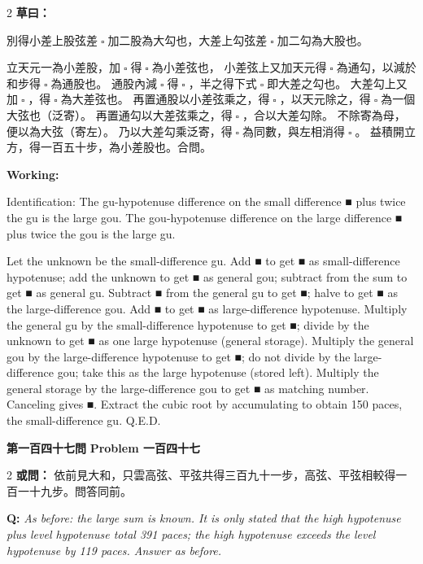 \documentclass[11pt,a4paper]{article}
\let\origsquare\square
\renewcommand{\square}{\ensuremath{\origsquare}}%
\newcommand{\wen}[1]{%
  \par\vspace{0.5em}%
  \noindent\textcolor{problemcolor}{\textbf{第#1問}}%
  \hfill\textcolor{problemcolor}{\textbf{Problem #1}}\par\nopagebreak%
  \vspace{0.3em}%
}
\newcommand{\owen}[1]{%
  \noindent\textcolor{problemcolor}{\textbf{或問：}}{\tradfont #1}\par\nopagebreak%
}
\newcommand{\oweneng}[1]{%
  \noindent\textcolor{engcolor}{\textbf{Q: }}{\itshape #1}\par\nopagebreak%
}
\newcommand{\tsaoyue}[1]{%
  \noindent\textcolor{workcolor}{\textbf{草曰：}}{\tradfont #1}\par%
}
\newcommand{\tsaoyueeng}[1]{%
  \noindent\textcolor{engcolor}{\textbf{Working: }}{\small #1}\par%
}
\begin{document}
\begin{paracol}{2}
\tsaoyue{%
別得小差上股弦差$ \; \square \; $加二股為大勾也，大差上勾弦差$ \; \square \; $加二勾為大股也。

立天元一為小差股，加$ \; \square \; $得$ \; \square \; $為小差弦也，
小差弦上又加天元得$ \; \square \; $為通勾，以減於和步得$ \; \square \; $為通股也。
通股內減$ \; \square \; $得$ \; \square \; $，半之得下式$ \; \square \; $即大差之勾也。
大差勾上又加$ \; \square \; $，得$ \; \square \; $為大差弦也。
再置通股以小差弦乘之，得$ \; \square \; $，以天元除之，得$ \; \square \; $為一個大弦也（泛寄）。
再置通勾以大差弦乘之，得$ \; \square \; $，合以大差勾除。
不除寄為母，便以為大弦（寄左）。
乃以大差勾乘泛寄，得$ \; \square \; $為同數，與左相消得$ \; \square \; $。
益積開立方，得一百五十步，為小差股也。合問。}
\switchcolumn
\tsaoyueeng{%
Identification: The gu-hypotenuse difference on the small difference ■ plus twice the gu is the large gou. The gou-hypotenuse difference on the large difference ■ plus twice the gou is the large gu.

Let the unknown be the small-difference gu. Add ■ to get ■ as small-difference hypotenuse; add the unknown to get ■ as general gou; subtract from the sum to get ■ as general gu. Subtract ■ from the general gu to get ■; halve to get ■ as the large-difference gou. Add ■ to get ■ as large-difference hypotenuse. Multiply the general gu by the small-difference hypotenuse to get ■; divide by the unknown to get ■ as one large hypotenuse (general storage). Multiply the general gou by the large-difference hypotenuse to get ■; do not divide by the large-difference gou; take this as the large hypotenuse (stored left). Multiply the general storage by the large-difference gou to get ■ as matching number. Canceling gives ■. Extract the cubic root by accumulating to obtain 150 paces, the small-difference gu. Q.E.D.}
\end{paracol}

\vspace{0.5cm}

\wen{一百四十七}

\begin{paracol}{2}
\owen{%
依前見大和，只雲高弦、平弦共得三百九十一步，高弦、平弦相較得一百一十九步。問答同前。}
\switchcolumn
\oweneng{%
As before: the large sum is known. It is only stated that the high hypotenuse plus level hypotenuse total 391 paces; the high hypotenuse exceeds the level hypotenuse by 119 paces. Answer as before.}
\end{paracol}
\end{document}
